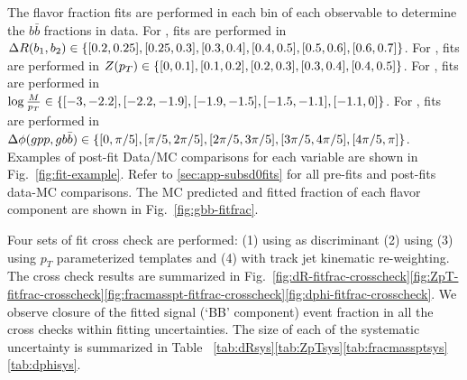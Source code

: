 \label{sec:gbb-bkgres}

The flavor fraction fits are performed in each bin of each observable to determine the $b\bar b $ fractions in data. For \drbb, fits are performed in ${ \Delta R(b_1, b_2) } \in\{[0.2, 0.25], [0.25, 0.3], [0.3, 0.4], [0.4,0.5], [0.5,0.6], [0.6,0.7]\}$. For \zpt, fits are performed in $Z(p_T) \in\{[0, 0.1], [0.1, 0.2], [0.2, 0.3], [0.3,0.4], [0.4,0.5]\}$. For \mpt, fits are performed in $\log{\frac{M}{p_T}} \in\{[-3, -2.2], [-2.2, -1.9], [-1.9, -1.5], [-1.5, -1.1], [-1.1,0]\}$. For \dphi, fits are performed in $\Delta \phi(gpp,gb\bar{b}) \in\{[0, \pi/5], [\pi/5, 2\pi/5], [2\pi/5, 3\pi/5], [3\pi/5, 4\pi/5], [4\pi/5, \pi]\}$. Examples of post-fit Data/MC comparisons for each variable are shown in Fig.~\ref{fig:fit-example}. Refer to \ref{sec:app-subsd0fits} for all pre-fits and post-fits data-MC comparisons. The MC predicted and fitted fraction of each flavor component are shown in Fig.~\ref{fig:gbb-fitfrac}.

Four sets of fit cross check are performed: (1) using \sdzero as discriminant (2) using \subsubsdzero (3) using $p_T$ parameterized templates and (4) with track jet kinematic re-weighting. The cross check results are summarized in Fig.~\ref{fig:dR-fitfrac-crosscheck}\ref{fig:ZpT-fitfrac-crosscheck}\ref{fig:fracmasspt-fitfrac-crosscheck}\ref{fig:dphi-fitfrac-crosscheck}. We observe closure of the fitted signal (`BB' component) event fraction in all the cross checks within fitting uncertainties. The size of each of the systematic uncertainty is summarized in Table ~\ref{tab:dRsys}\ref{tab:ZpTsys}\ref{tab:fracmassptsys}\ref{tab:dphisys}.

